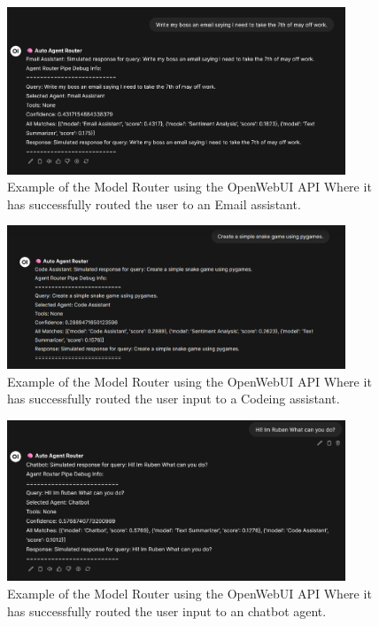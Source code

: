 \begin{figure}[H]
    \centering
    \includegraphics[width=0.9\textwidth]{figures/owui-agent-demo-0.png}
    \caption{Example of the Model Router using the OpenWebUI API Where it has successfully routed the user to an Email assistant.}
    \label{fig:model_router_plugin_demo_0}
\end{figure}

\begin{figure}[H]
    \centering
    \includegraphics[width=0.9\textwidth]{figures/owui-agent-demo-1.png}
    \caption{Example of the Model Router using the OpenWebUI API Where it has successfully routed the user input to a Codeing assistant.}
    \label{fig:model_router_plugin_demo_1}
\end{figure}

\begin{figure}[H]
    \centering
    \includegraphics[width=0.9\textwidth]{figures/owui-agent-demo-2.png}
    \caption{Example of the Model Router using the OpenWebUI API Where it has successfully routed the user input to an chatbot agent.}
    \label{fig:model_router_plugin_demo_2}
\end{figure}



